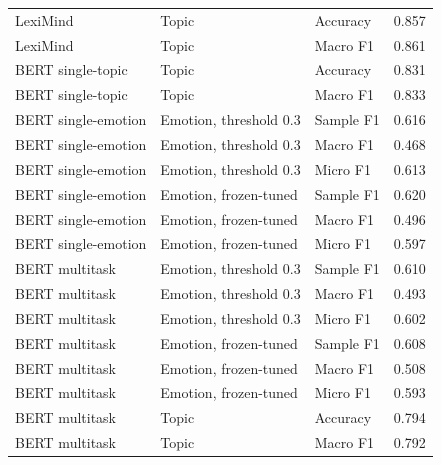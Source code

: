 \begin{longtable}{p{2.4cm}p{4.5cm}p{2.3cm}r}
LexiMind & Topic & Accuracy & 0.857 \\
LexiMind & Topic & Macro F1 & 0.861 \\
BERT single-topic & Topic & Accuracy & 0.831 \\
BERT single-topic & Topic & Macro F1 & 0.833 \\
BERT single-emotion & Emotion, threshold 0.3 & Sample F1 & 0.616 \\
BERT single-emotion & Emotion, threshold 0.3 & Macro F1 & 0.468 \\
BERT single-emotion & Emotion, threshold 0.3 & Micro F1 & 0.613 \\
BERT single-emotion & Emotion, frozen-tuned & Sample F1 & 0.620 \\
BERT single-emotion & Emotion, frozen-tuned & Macro F1 & 0.496 \\
BERT single-emotion & Emotion, frozen-tuned & Micro F1 & 0.597 \\
BERT multitask & Emotion, threshold 0.3 & Sample F1 & 0.610 \\
BERT multitask & Emotion, threshold 0.3 & Macro F1 & 0.493 \\
BERT multitask & Emotion, threshold 0.3 & Micro F1 & 0.602 \\
BERT multitask & Emotion, frozen-tuned & Sample F1 & 0.608 \\
BERT multitask & Emotion, frozen-tuned & Macro F1 & 0.508 \\
BERT multitask & Emotion, frozen-tuned & Micro F1 & 0.593 \\
BERT multitask & Topic & Accuracy & 0.794 \\
BERT multitask & Topic & Macro F1 & 0.792 \\
\end{longtable}
